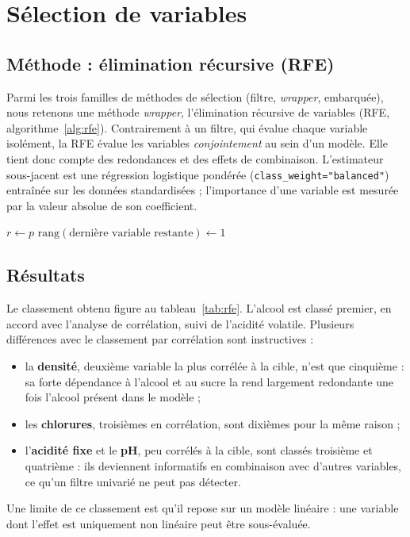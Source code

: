 \documentclass[11pt,a4paper]{article}
\newcommand{\code}[1]{\texttt{#1}}
\begin{document}
\section{Sélection de variables}\label{sec:selection}

\subsection{Méthode : élimination récursive (RFE)}
Parmi les trois familles de méthodes de sélection (filtre, \emph{wrapper}, embarquée), nous retenons une méthode \emph{wrapper}, l'élimination récursive de variables (RFE, algorithme~\ref{alg:rfe}). Contrairement à un filtre, qui évalue chaque variable isolément, la RFE évalue les variables \emph{conjointement} au sein d'un modèle. Elle tient donc compte des redondances et des effets de combinaison. L'estimateur sous-jacent est une régression logistique pondérée (\code{class\_weight="balanced"}) entraînée sur les données standardisées ; l'importance d'une variable est mesurée par la valeur absolue de son coefficient.

\begin{algorithm}[H]
\caption{Élimination récursive de variables (RFE)}
\label{alg:rfe}
$r \leftarrow p$\;
$\text{rang}(\text{dernière variable restante}) \leftarrow 1$\;
\end{algorithm}

\subsection{Résultats}
Le classement obtenu figure au tableau~\ref{tab:rfe}. L'alcool est classé premier, en accord avec l'analyse de corrélation, suivi de l'acidité volatile. Plusieurs différences avec le classement par corrélation sont instructives :
\begin{itemize}
  \item la \textbf{densité}, deuxième variable la plus corrélée à la cible, n'est que cinquième : sa forte dépendance à l'alcool et au sucre la rend largement redondante une fois l'alcool présent dans le modèle ;
  \item les \textbf{chlorures}, troisièmes en corrélation, sont dixièmes pour la même raison ;
  \item l'\textbf{acidité fixe} et le \textbf{pH}, peu corrélés à la cible, sont classés troisième et quatrième : ils deviennent informatifs en combinaison avec d'autres variables, ce qu'un filtre univarié ne peut pas détecter.
\end{itemize}
Une limite de ce classement est qu'il repose sur un modèle linéaire : une variable dont l'effet est uniquement non linéaire peut être sous-évaluée.
\end{document}
